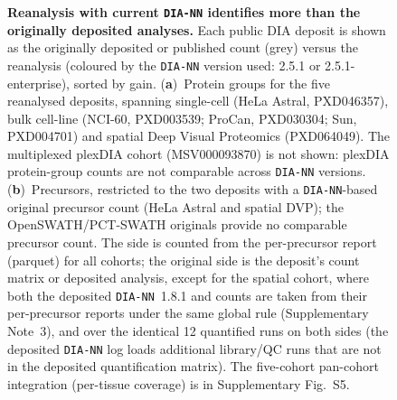 \documentclass[preprint,12pt]{elsarticle}
\begin{document}
\begin{figure}[htbp]
  \centering
  \caption[Reanalysis vs original analysis]{%
    \textbf{Reanalysis with current \texttt{DIA-NN} identifies more than the
    originally deposited analyses.} Each public DIA deposit is shown as the
    originally deposited or published count (grey) versus the \quantmsdiann{}
    reanalysis (coloured by the \texttt{DIA-NN} version used: 2.5.1 or
    2.5.1-enterprise), sorted by gain.
    (\textbf{a})~Protein groups for the five reanalysed deposits, spanning
    single-cell (HeLa Astral, PXD046357), bulk cell-line (NCI-60, PXD003539;
    ProCan, PXD030304; Sun, PXD004701) and spatial Deep Visual Proteomics
    (PXD064049). The multiplexed plexDIA cohort (MSV000093870) is not shown:
    plexDIA protein-group counts are not comparable across \texttt{DIA-NN}
    versions.
    (\textbf{b})~Precursors, restricted to the two deposits with a
    \texttt{DIA-NN}-based original precursor count (HeLa Astral and spatial
    DVP); the OpenSWATH/PCT-SWATH originals provide no comparable precursor
    count.
    The \quantmsdiann{} side is counted from the per-precursor report (parquet)
    for all cohorts; the original side is the deposit's count matrix or deposited analysis, except for the spatial cohort, where both the deposited
    \texttt{DIA-NN}~1.8.1 and \quantmsdiann{} counts are taken from their
    per-precursor reports under the same global rule (Supplementary Note~3), and
    over the identical 12 quantified runs on both sides (the deposited
    \texttt{DIA-NN} log loads additional library/QC runs that are not in the
    deposited quantification matrix). The
    five-cohort pan-cohort integration (per-tissue coverage) is in Supplementary
    Fig.~S5.
  }
  \label{fig:reanalysis}
\end{figure}
\end{document}
